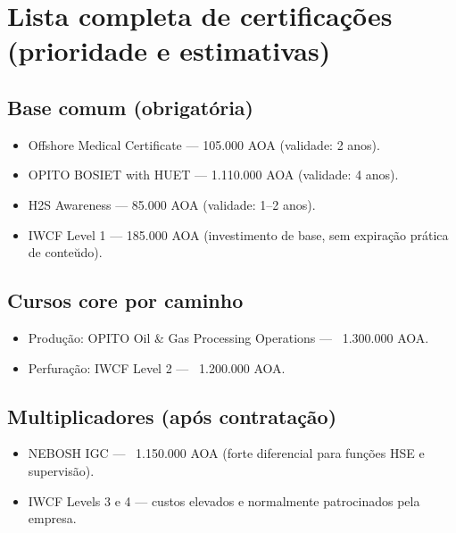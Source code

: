 \documentclass[11pt,openany]{book}
\begin{document}
\section{Lista completa de certifica\c{c}\~oes (prioridade e estimativas)}
\subsection{Base comum (obrigat\'oria)}
\begin{itemize}
  \item Offshore Medical Certificate --- 105.000 AOA (validade: 2 anos).
  \item OPITO BOSIET with HUET --- 1.110.000 AOA (validade: 4 anos).
  \item H2S Awareness --- 85.000 AOA (validade: 1--2 anos).
  \item IWCF Level 1 --- 185.000 AOA (investimento de base, sem expira\c{c}\~ao pr\'atica de conte\u{u}do).
\end{itemize}

\subsection{Cursos core por caminho}
\begin{itemize}
  \item Produ\c{c}\~ao: OPITO Oil \& Gas Processing Operations --- ~1.300.000 AOA.
  \item Perfura\c{c}\~ao: IWCF Level 2 --- ~1.200.000 AOA.
\end{itemize}

\subsection{Multiplicadores (ap\'os contrata\c{c}\~ao)}
\begin{itemize}
  \item NEBOSH IGC --- ~1.150.000 AOA (forte diferencial para fun\c{c}\~oes HSE e supervis\~ao).
  \item IWCF Levels 3 e 4 --- custos elevados e normalmente patrocinados pela empresa.
\end{itemize}
\end{document}
